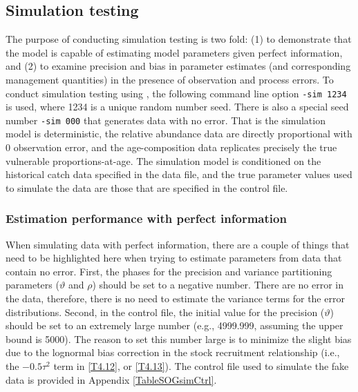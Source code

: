 	
	

	
	\subsection{Simulation testing}
	
		The purpose of conducting simulation testing is two fold: (1) to demonstrate that the model is capable of estimating model parameters given perfect information, and (2) to examine precision and bias in parameter estimates (and corresponding management quantities) in the presence of observation and process errors.  To conduct simulation testing using \iscam, the following command line option \verb"-sim 1234" is used, where 1234 is a unique random number seed.  There is also a special seed number \verb"-sim 000" that generates data with no error.  That is the simulation model is deterministic, the relative abundance data are directly proportional with 0 observation error, and the age-composition data replicates precisely the true vulnerable proportions-at-age.  The simulation model is conditioned on the historical catch data specified in the data file, and the true parameter values used to simulate the data are those that are specified in the control file.

	
		\subsubsection{Estimation performance with perfect information}
		 
When simulating data with perfect information, there are a couple of things that need to be highlighted here when trying to estimate parameters from data that contain no error.  First, the phases for the precision and variance partitioning parameters ($\vartheta$ and $\rho$) should be set to a negative number.  There are no error in the data, therefore, there is no need to estimate the variance terms for the error distributions.  Second, in the control file, the initial value for the precision ($\vartheta$) should be set to an extremely large number (e.g., 4999.999, assuming the upper bound is 5000).  The reason to set this number large is to minimize the slight bias due to the lognormal bias correction in the stock recruitment relationship (i.e., the $-0.5\tau^2$ term in \ref{T4.12}, or \ref{T4.13}). The control file used to simulate the fake data is provided in Appendix \ref{TableSOGsimCtrl}.




